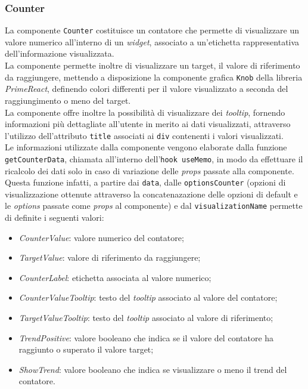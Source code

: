 \subsubsection{Counter}
La componente \texttt{Counter} costituisce un contatore che permette di visualizzare un valore numerico all'interno di un \textit{widget}, associato a un'etichetta
rappresentativa dell'informazione visualizzata. \\
La componente permette inoltre di visualizzare un target, il valore di riferimento da raggiungere, mettendo a disposizione la componente grafica \texttt{Knob}
della libreria \textit{PrimeReact}, definendo colori differenti per il valore visualizzato a seconda del raggiungimento o meno del target. \\
La componente offre inoltre la possibilità di visualizzare dei \textit{tooltip}, fornendo informazioni più dettagliate all'utente
in merito ai dati visualizzati, attraverso l'utilizzo dell'attributo \texttt{title} associati ai \texttt{div} contenenti i valori visualizzati. \\
Le informazioni utilizzate dalla componente vengono elaborate dalla funzione \\
\texttt{getCounterData}, chiamata all'interno dell'\texttt{hook useMemo}, in modo da
effettuare il ricalcolo dei dati solo in caso di variazione delle \textit{props} passate alla componente. Questa funzione infatti, a partire dai \texttt{data}, dalle \texttt{optionsCounter}
(opzioni di visualizzazione ottenute attraverso la concatenazazione delle opzioni di default e le \textit{options} passate come \textit{props} al componente) e dal \texttt{visualizationName}
permette di definite i seguenti valori:
\begin{itemize}
    \item \textit{CounterValue}: valore numerico del contatore;
    \item \textit{TargetValue}: valore di riferimento da raggiungere;
    \item \textit{CounterLabel}: etichetta associata al valore numerico;
    \item \textit{CounterValueTooltip}: testo del \textit{tooltip} associato al valore del contatore;
    \item \textit{TargetValueTooltip}: testo del \textit{tooltip} associato al valore di riferimento;
    \item \textit{TrendPositive}: valore booleano che indica se il valore del contatore ha raggiunto o superato il valore target;
    \item \textit{ShowTrend}: valore booleano che indica se visualizzare o meno il trend del contatore.
\end{itemize}
